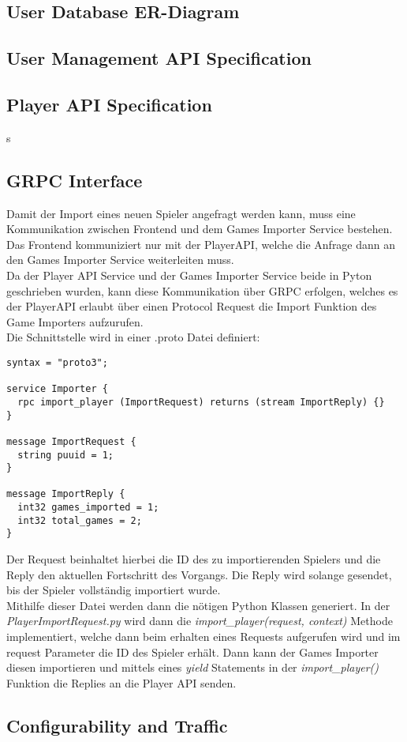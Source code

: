 \subsection{User Database ER-Diagram}

\subsection{User Management API Specification}

\subsection{Player API Specification}s

\subsection{GRPC Interface}
Damit der Import eines neuen Spieler angefragt werden kann, muss eine Kommunikation zwischen Frontend und dem Games Importer Service bestehen. Das Frontend kommuniziert nur mit der PlayerAPI, welche die Anfrage dann an den Games Importer Service weiterleiten muss.\\
Da der Player API Service und der Games Importer Service beide in Pyton geschrieben wurden, kann diese Kommunikation über GRPC erfolgen, welches es der PlayerAPI erlaubt über einen Protocol Request die Import Funktion des Game Importers aufzurufen.\\
Die Schnittstelle wird in einer .proto Datei definiert:

\begin{lstlisting}
syntax = "proto3";

service Importer {
  rpc import_player (ImportRequest) returns (stream ImportReply) {}
}

message ImportRequest {
  string puuid = 1;
}

message ImportReply {
  int32 games_imported = 1;
  int32 total_games = 2;
}
\end{lstlisting}
Der Request beinhaltet hierbei die ID des zu importierenden Spielers und die Reply den aktuellen Fortschritt des Vorgangs. Die Reply wird solange gesendet, bis der Spieler vollständig importiert wurde.\\
Mithilfe dieser Datei werden dann die nötigen Python Klassen generiert. In der \textit{PlayerImportRequest.py} wird dann die \textit{import\_player(request, context)} Methode implementiert, welche dann beim erhalten eines Requests aufgerufen wird und im request Parameter die ID des Spieler erhält. Dann kann der Games Importer diesen importieren und mittels eines \textit{yield} Statements in der \textit{import\_player()} Funktion die Replies an die Player API senden.

\subsection{Configurability and Traffic}